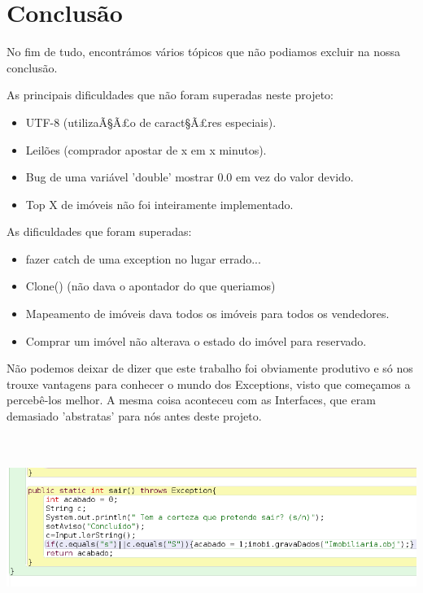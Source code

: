\documentclass[12pt]{article}
\begin{document}
\pagebreak

 
\section{Conclusão}

No fim de tudo, encontrámos vários tópicos que não podiamos excluir na nossa conclusão.

As principais dificuldades que não foram superadas neste projeto:
\begin{itemize}
\item UTF-8 (utilizaÃ§Ã£o de caract§Ã£res especiais).
\item Leilões (comprador apostar de x em x minutos).
\item Bug de uma variável 'double'  mostrar 0.0 em vez do valor devido.
\item Top X de imóveis não foi inteiramente implementado.
\end{itemize}
As dificuldades que foram superadas:
\begin{itemize}
\item fazer catch de uma exception no lugar errado...
\item Clone() (não dava o apontador do que queriamos)
\item Mapeamento de imóveis dava todos os imóveis para todos os vendedores.
\item Comprar um imóvel não alterava o estado do imóvel para reservado.
\end{itemize}

Não podemos deixar de dizer que este trabalho foi obviamente produtivo e só nos trouxe vantagens para conhecer o mundo dos Exceptions, visto que começamos a percebê-los melhor. A mesma coisa aconteceu com as Interfaces, que eram demasiado 'abstratas' para nós antes deste projeto.

~\\
~\\

\includegraphics[scale=0.4]{005.png}	
\end{document}
